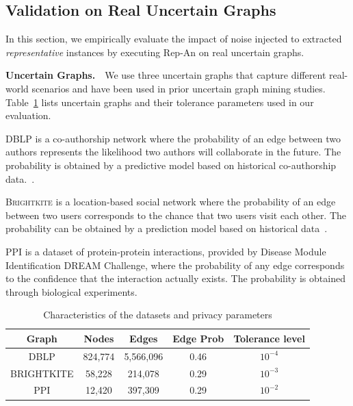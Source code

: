 \subsection{Validation on Real Uncertain Graphs}
In this section, we empirically evaluate the impact of noise injected to extracted \emph{representative} instances by executing Rep-An on real uncertain graphs.

\textbf{Uncertain Graphs.}~~We use three uncertain graphs that capture different real-world scenarios and have been used in prior uncertain graph mining studies. Table~\ref{tab:dataset} lists uncertain graphs and their tolerance parameters used in our evaluation.

\textsc{DBLP} is a co-authorship network where the probability of an edge between two authors represents the likelihood two authors will collaborate in the future. The probability is obtained by a predictive model based on historical co-authorship data.~\cite{Jin_Distance_2011}. 

\textsc{Brightkite} is a location-based social network where the probability of an edge between two users corresponds to the chance that two users visit each other. The probability can be obtained by a prediction model based on historical data~\cite{Cho_Friendship_2011}.

\textsc{PPI} is a dataset of protein-protein interactions, provided by Disease Module Identification DREAM Challenge, where the probability of any edge corresponds to the confidence that the interaction actually exists.
The probability is obtained through biological experiments.

\begin{table}[t]
    \centering
        \caption{Characteristics of the datasets and privacy parameters}
        \begin{tabular}{|c|c|c|c||c|}
        \hline 
        Graph    & Nodes    & Edges    &Edge Prob    & Tolerance level\\
        \hline  
        DBLP     &824,774   &5,566,096 & 0.46        & $10^{-4}$\\
        \small{BRIGHTKITE} &58,228   & 214,078 &0.29 &$10^{-3}$ \\
        PPI      &12,420   & 397,309  & 0.29         &$10^{-2}$\\
        \hline
        \end{tabular}
        \label{tab:dataset}
\end{table}

